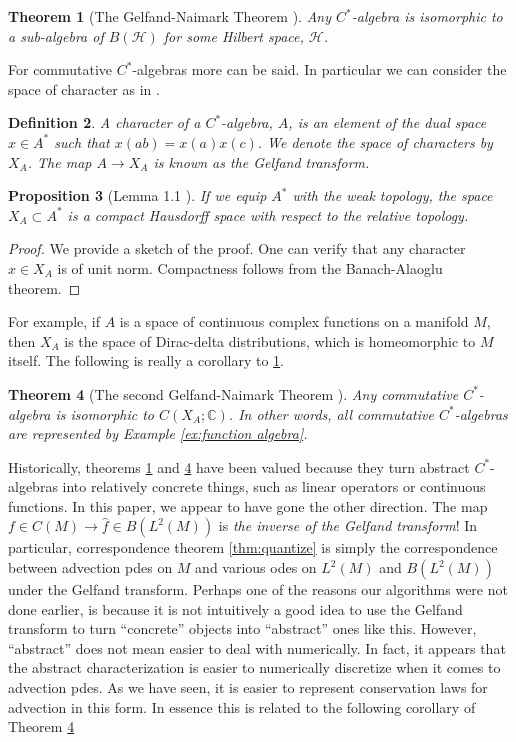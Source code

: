 \documentclass[12pt]{amsart}
\newtheorem{thm}{Theorem}[section]
\newtheorem{prop}[thm]{Proposition}
\newtheorem{defn}[thm]{Definition}
\begin{document}
\begin{thm}[The Gelfand-Naimark Theorem \cite{GelfandNaimark1943}] \label{thm:GN1}
	Any $C^{*}$-algebra is isomorphic to a sub-algebra of $B(\mathcal{H})$ for some Hilbert space, $\mathcal{H}$.
\end{thm}

For commutative $C^{*}$-algebras more can be said.
In particular we can consider the space of character as in \cite{Bondia2001}.

\begin{defn}
	A \emph{character} of a $C^{*}$-algebra, $A$, is an element of the dual space $x \in A^{*}$ such that
	$x(ab) = x(a) x(c)$.  We denote the space of characters by $X_{A}$.
	The map $A \to X_{A}$ is known as the \emph{Gelfand transform}.
\end{defn}

\begin{prop}[Lemma 1.1 \cite{Bondia2001}]
	If we equip $A^{*}$ with the weak topology, the space $X_{A} \subset A^{*}$ is a compact Hausdorff space with respect to the relative topology.
\end{prop}
\begin{proof}
	We provide a sketch of the proof.
	One can verify that any character $x \in X_{A}$ is of unit norm.
	Compactness follows from the Banach-Alaoglu theorem.
\end{proof}

For example, if $A$ is a space of continuous complex functions on a manifold $M$, then $X_{A}$ is the space of Dirac-delta distributions, which is homeomorphic to $M$ itself.
The following is really a corollary to \ref{thm:GN1}.

\begin{thm}[The second Gelfand-Naimark Theorem \cite{GelfandNaimark1943}] \label{thm:GN2}
	Any commutative $C^{*}$-algebra is isomorphic to $C(X_{A} ; \mathbb{C})$.
	In other words, all commutative $C^{*}$-algebras are represented by Example \ref{ex:function algebra}.
\end{thm}

Historically, theorems \ref{thm:GN1} and \ref{thm:GN2} have been valued because they turn abstract $C^{*}$-algebras into relatively concrete things, such as linear operators or continuous functions.
In this paper, we appear to have gone the other direction.
The map $f \in C(M) \to \hat{f} \in B( L^{2}(M) )$ is \emph{the inverse of the Gelfand transform}!
In particular, correspondence theorem \ref{thm:quantize} is simply the correspondence between advection pdes on $M$ and various odes on $L^{2}(M)$ and $B(L^{2}(M))$ under the Gelfand transform.
Perhaps one of the reasons our algorithms were not done earlier, is because it is not intuitively a good idea to use the Gelfand transform to turn ``concrete'' objects into ``abstract'' ones like this.
However, ``abstract'' does not mean easier to deal with numerically.
In fact, it appears that the abstract characterization is easier to numerically discretize when it comes to advection pdes.
As we have seen, it is easier to represent conservation laws for advection in this form.
In essence this is related to the following corollary of Theorem \ref{thm:GN2}
\end{document}

